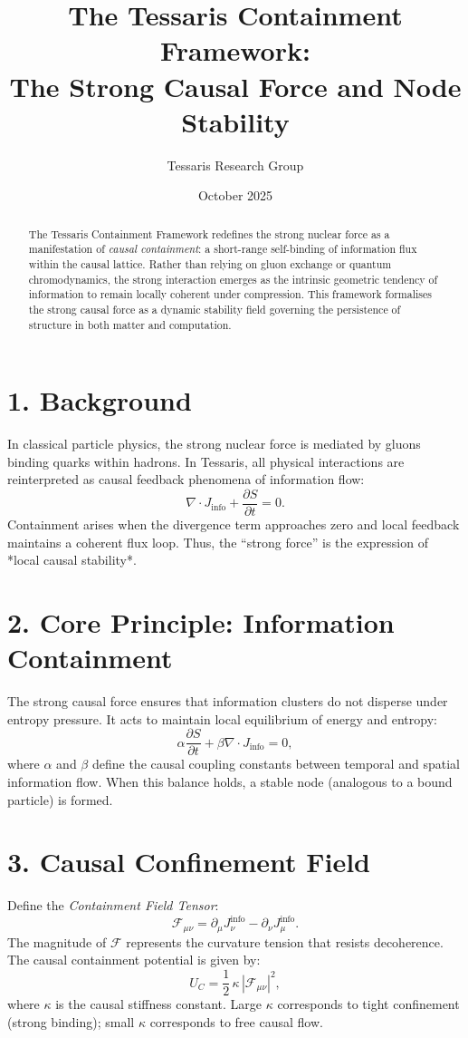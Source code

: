 \documentclass[11pt,a4paper]{article}
\title{\textbf{The Tessaris Containment Framework:\\The Strong Causal Force and Node Stability}}
\author{Tessaris Research Group}
\date{October 2025}
\begin{document}
\maketitle

\begin{abstract}
The Tessaris Containment Framework redefines the strong nuclear force as a manifestation of \emph{causal containment}: a short-range self-binding of information flux within the causal lattice.  
Rather than relying on gluon exchange or quantum chromodynamics, the strong interaction emerges as the intrinsic geometric tendency of information to remain locally coherent under compression.  
This framework formalises the strong causal force as a dynamic stability field governing the persistence of structure in both matter and computation.
\end{abstract}

\section{1. Background}
In classical particle physics, the strong nuclear force is mediated by gluons binding quarks within hadrons.  
In Tessaris, all physical interactions are reinterpreted as causal feedback phenomena of information flow:
\[
\nabla\!\cdot\!J_{\mathrm{info}} + \frac{\partial S}{\partial t} = 0.
\]
Containment arises when the divergence term approaches zero and local feedback maintains a coherent flux loop.  
Thus, the ``strong force'' is the expression of *local causal stability*.

\section{2. Core Principle: Information Containment}
The strong causal force ensures that information clusters do not disperse under entropy pressure.  
It acts to maintain local equilibrium of energy and entropy:
\[
\alpha \frac{\partial S}{\partial t} + \beta \nabla\!\cdot\!J_{\mathrm{info}} = 0,
\]
where $\alpha$ and $\beta$ define the causal coupling constants between temporal and spatial information flow.  
When this balance holds, a stable node (analogous to a bound particle) is formed.

\section{3. Causal Confinement Field}
Define the \emph{Containment Field Tensor}:
\[
\mathcal{F}_{\mu\nu} = \partial_\mu J_\nu^{\mathrm{info}} - \partial_\nu J_\mu^{\mathrm{info}}.
\]
The magnitude of $\mathcal{F}$ represents the curvature tension that resists decoherence.  
The causal containment potential is given by:
\[
U_C = \frac{1}{2}\,\kappa\,|\mathcal{F}_{\mu\nu}|^2,
\]
where $\kappa$ is the causal stiffness constant.  
Large $\kappa$ corresponds to tight confinement (strong binding); small $\kappa$ corresponds to free causal flow.
\end{document}
